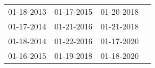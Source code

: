 \begin{supertabular}{llll}
 01-18-2013 &  01-17-2015 &  01-20-2018 \\
 01-17-2014 &  01-21-2016 &  01-21-2018 \\
 01-18-2014 &  01-22-2016 &  01-17-2020 \\
 01-16-2015 &  01-19-2018 &  01-18-2020 \\
\end{supertabular}
